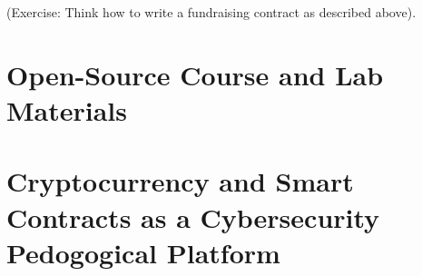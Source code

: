 \documentclass[10pt,twocolumn,letterpaper]{article}
\begin{document}
(Exercise: Think how to write a fundraising contract as described above).

\section{Open-Source Course and Lab Materials}

\section{Cryptocurrency and Smart Contracts as a Cybersecurity Pedogogical Platform}














\end{document}
